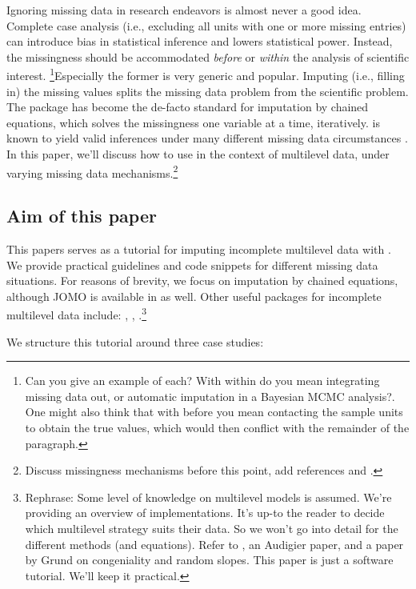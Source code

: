 \documentclass[
]{jss}
\begin{document}
Ignoring missing data in research endeavors is almost never a good idea.
Complete case analysis (i.e., excluding all units with one or more
missing entries) can introduce bias in statistical inference and lowers
statistical power. Instead, the missingness should be accommodated
\emph{before} or \emph{within} the analysis of scientific interest.
\footnote{Can you give an example of each? With within do you mean
  integrating missing data out, or automatic imputation in a Bayesian
  MCMC analysis?. One might also think that with before you mean
  contacting the sample units to obtain the true values, which would
  then conflict with the remainder of the paragraph.}Especially the
former is very generic and popular. Imputing (i.e., filling in) the
missing values splits the missing data problem from the scientific
problem. The  package  has become the de-facto
standard for imputation by chained equations, which solves the
missingness one variable at a time, iteratively.  is known to
yield valid inferences under many different missing data circumstances
\citep{buur18}. In this paper, we'll discuss how to use  in
the context of multilevel data, under varying missing data
mechanisms.\footnote{Discuss missingness mechanisms before this point,
  add references \citet{yuce08} and \citet{hox15}.}

\hypertarget{aim-of-this-paper}{%
\subsection{Aim of this paper}\label{aim-of-this-paper}}

This papers serves as a tutorial for imputing incomplete multilevel data
with . We provide practical guidelines and code snippets for
different missing data situations. For reasons of brevity, we focus on
imputation by chained equations, although JOMO is available in
 as well. Other useful packages for incomplete multilevel data
include: , , .\footnote{Rephrase:
  Some level of knowledge on multilevel models is assumed. We're
  providing an overview of implementations. It's up-to the reader to
  decide which multilevel strategy suits their data. So we won't go into
  detail for the different methods (and equations). Refer to
  \citet{meng94}, an Audigier paper, and a paper by Grund on
  congeniality and random slopes. This paper is just a software
  tutorial. We'll keep it practical.}

We structure this tutorial around three case studies:
\end{document}
